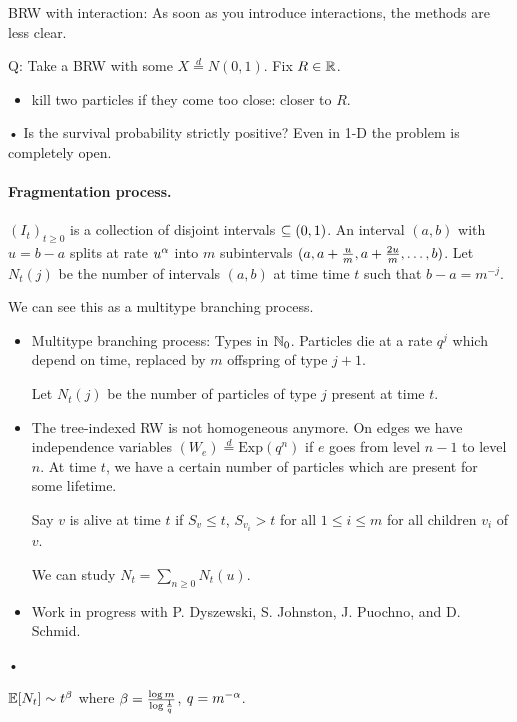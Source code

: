 BRW with interaction: As soon as you introduce interactions, the methods are less clear.

Q: Take a BRW with some $X\stackrel d= N(0,1)$.  Fix $R\in \mathbb{R}$.
\begin{itemize}
\item
kill two particles if they come too close: closer to $R$.
\end{itemize}•
Is the survival probability strictly positive?
Even in 1-D the problem is completely open.

\paragraph{Fragmentation process.} $(I_t)_{t\ge 0}$ is a collection of disjoint intervals $\subseteq (0,1)$. An interval $(a,b)$ with $u=b-a$ splits  at rate $u^\alpha$ into $m$ subintervals $(a, a+\frac{u}{m},a+\frac{2u}{m},\ldots, b)$. 
Let $N_t(j)$ be the number of intervals $(a,b)$ at time time $t$ such that $b-a = m^{-j}$.

We can see this as a multitype branching process.
\begin{itemize}
\item
Multitype branching process: Types in $\mathbb{N}_0$. Particles die at a rate $q^j$ which depend on time, replaced by $m$ offspring of type $j+1$.

Let $N_t(j)$ be the number of particles of type $j$ present at time $t$.
\item
The tree-indexed RW is not homogeneous anymore. On edges we have independence variables $(W_e)\stackrel d= \text{Exp}(q^n)$ if $e$ goes from level $n-1$ to level $n$.
At time $t$, we have a certain number of particles which are present for some lifetime.

Say $v$ is alive at time $t$ if $S_v\le t$, $S_{v_i}>t$ for all $1\le i\le m$ for all children $v_i$ of $v$.

We can study $N_t=\sum_{n \ge 0} N_t(u)$.
\item
Work in progress with P. Dyszewski, S. Johnston, J. Puochno, and D. Schmid.
\end{itemize}•
\begin{thm}
$\mathbb{E}[N_t]\sim t^\beta $ where $\beta = \frac{\log m}{\log \frac{1}{q}}$, $q=m^{-\alpha}$. 
\end{thm}

